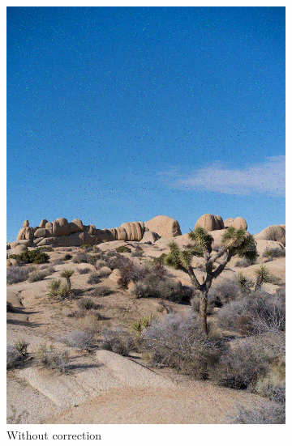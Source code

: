 \documentclass{article}
\begin{document}
\begin{figure}[htb]
\begin{subfigure}[b]{0.32\textwidth}
        \includegraphics[width=\textwidth]{../Result/Linear/linear-bsc-output.png}
        \caption{Without correction}
        \label{fig:image-linear-bsc-no-correction}
    \end{subfigure}
    \hfill
    \begin{subfigure}[b]{0.32\textwidth}
        \centering

\end{subfigure}
\end{figure}
\end{document}
